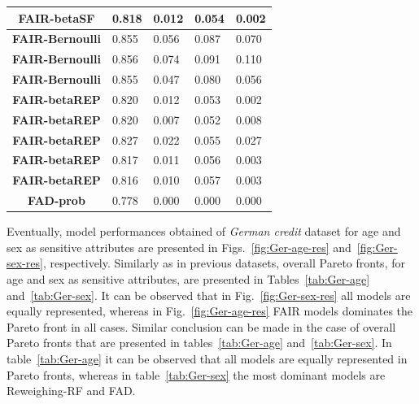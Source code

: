 \documentclass[preprint,12pt]{elsarticle}
\begin{document}
\begin{table}
\begin{tabular}{|c|l|l|l|l|}
		\textbf{FAIR-betaSF}    & 0.818                             & 0.012                             & 0.054                             & 0.002                              \\ \hline
		\textbf{FAIR-Bernoulli} & 0.855                             & 0.056                             & 0.087                             & 0.070                              \\ \hline
		\textbf{FAIR-Bernoulli} & 0.856                             & 0.074                             & 0.091                             & 0.110                              \\ \hline
		\textbf{FAIR-Bernoulli} & 0.855                             & 0.047                             & 0.080                             & 0.056                              \\ \hline
		\textbf{FAIR-betaREP}   & 0.820                             & 0.012                             & 0.053                             & 0.002                              \\ \hline
		\textbf{FAIR-betaREP}   & 0.820                             & 0.007                             & 0.052                             & 0.008                              \\ \hline
		\textbf{FAIR-betaREP}   & 0.827                             & 0.022                             & 0.055                             & 0.027                              \\ \hline
		\textbf{FAIR-betaREP}   & 0.817                             & 0.011                             & 0.056                             & 0.003                              \\ \hline
		\textbf{FAIR-betaREP}   & 0.816                             & 0.010                             & 0.057                             & 0.003                              \\ \hline
		\textbf{FAD-prob}       & 0.778                             & 0.000                             & 0.000                             & 0.000                              \\ \hline
	\end{tabular}
	\label{tab:MEPS-19}%
\end{table}

Eventually, model performances obtained of \textit{German credit} dataset for age and sex as sensitive attributes are presented in Figs.~\ref{fig:Ger-age-res} and~\ref{fig:Ger-sex-res}, respectively. Similarly as in previous datasets, overall Pareto fronts, for age and sex as sensitive attributes, are presented in Tables~\ref{tab:Ger-age} and~\ref{tab:Ger-sex}. It can be observed that in  Fig.~\ref{fig:Ger-sex-res} all models are equally represented, whereas in  Fig.~\ref{fig:Ger-age-res} FAIR models dominates the Pareto front in all cases. Similar conclusion can be made in the case of overall Pareto fronts that are presented in tables~\ref{tab:Ger-age} and~\ref{tab:Ger-sex}. In table~\ref{tab:Ger-age} it can be observed that all models are equally represented in Pareto fronts, whereas in table~\ref{tab:Ger-sex} the most dominant models are Reweighing-RF and FAD.
\end{document}
